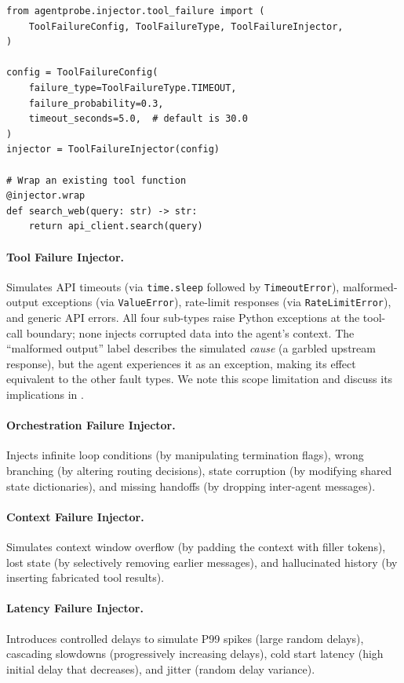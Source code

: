 \documentclass[make,article,submit,moreauthors,pdftex]{mdpi}
\begin{document}
\begin{lstlisting}[caption={Example: Injecting tool call failures with configurable probability.},label={lst:injector}]
from agentprobe.injector.tool_failure import (
    ToolFailureConfig, ToolFailureType, ToolFailureInjector,
)

config = ToolFailureConfig(
    failure_type=ToolFailureType.TIMEOUT,
    failure_probability=0.3,
    timeout_seconds=5.0,  # default is 30.0
)
injector = ToolFailureInjector(config)

# Wrap an existing tool function
@injector.wrap
def search_web(query: str) -> str:
    return api_client.search(query)
\end{lstlisting}

\paragraph{Tool Failure Injector.}
Simulates API timeouts (via \texttt{time.sleep} followed by \texttt{TimeoutError}), malformed-output exceptions (via \texttt{ValueError}), rate-limit responses (via \texttt{RateLimitError}), and generic API errors. All four sub-types raise Python exceptions at the tool-call boundary; none injects corrupted data into the agent's context. The ``malformed output'' label describes the simulated \emph{cause} (a garbled upstream response), but the agent experiences it as an exception, making its effect equivalent to the other fault types. We note this scope limitation and discuss its implications in .

\paragraph{Orchestration Failure Injector.}
Injects infinite loop conditions (by manipulating termination flags), wrong branching (by altering routing decisions), state corruption (by modifying shared state dictionaries), and missing handoffs (by dropping inter-agent messages).

\paragraph{Context Failure Injector.}
Simulates context window overflow (by padding the context with filler tokens), lost state (by selectively removing earlier messages), and hallucinated history (by inserting fabricated tool results).

\paragraph{Latency Failure Injector.}
Introduces controlled delays to simulate P99 spikes (large random delays), cascading slowdowns (progressively increasing delays), cold start latency (high initial delay that decreases), and jitter (random delay variance).
\end{document}
